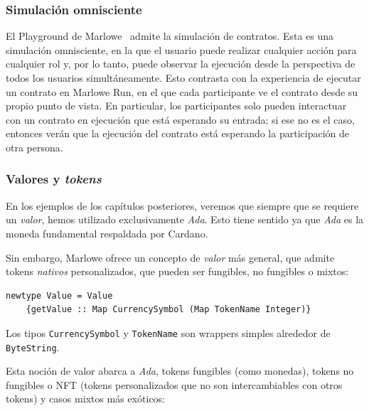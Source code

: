 \documentclass[12pt]{book}
\begin{document}
\subsubsection{Simulación omnisciente}
El Playground de Marlowe~\cite{marlowe_playground} admite la simulación de contratos. Esta es una simulación omnisciente, en la que el usuario puede realizar cualquier acción para cualquier rol y, por lo tanto, puede observar la ejecución desde la perspectiva de todos los usuarios simultáneamente. Esto contrasta con la experiencia de ejecutar un contrato en Marlowe Run, en el que cada participante ve el contrato desde su propio punto de vista. En particular, los participantes solo pueden interactuar con un contrato en ejecución que está esperando su entrada; si ese no es el caso, entonces verán que la ejecución del contrato está esperando la participación de otra persona.

\subsubsection{Valores y \textit{tokens}}
En los ejemplos de los capítulos posteriores, veremos que siempre que se requiere un \textit{valor}, hemos utilizado exclusivamente \textit{Ada}. Esto tiene sentido ya que \textit{Ada} es la moneda fundamental respaldada por Cardano.

Sin embargo, Marlowe ofrece un concepto de \textit{valor} más general, que admite tokens \textit{nativos} personalizados, que pueden ser fungibles, no fungibles o mixtos:

\begin{lstlisting}[style=Haskell-cardano, caption=Definicion del tipo \texttt{Value}]
newtype Value = Value
    {getValue :: Map CurrencySymbol (Map TokenName Integer)}
\end{lstlisting}

Los tipos \texttt{CurrencySymbol} y \texttt{TokenName} son wrappers simples alrededor de \texttt{ByteString}.


Esta noción de valor abarca a \textit{Ada}, tokens fungibles (como monedas), tokens no fungibles o NFT (tokens personalizados que no son intercambiables con otros tokens) y casos mixtos más exóticos:
\end{document}
